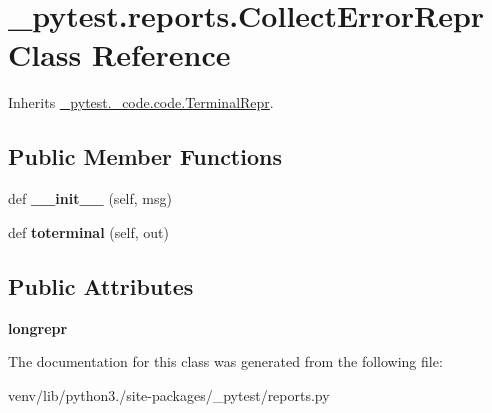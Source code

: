 \hypertarget{class__pytest_1_1reports_1_1_collect_error_repr}{}\section{\+\_\+pytest.\+reports.\+Collect\+Error\+Repr Class Reference}
\label{class__pytest_1_1reports_1_1_collect_error_repr}


Inherits \hyperlink{class__pytest_1_1__code_1_1code_1_1_terminal_repr}{\+\_\+pytest.\+\_\+code.\+code.\+Terminal\+Repr}.

\subsection*{Public Member Functions}
\begin{DoxyCompactItemize}
\item 
\mbox{\label{class__pytest_1_1reports_1_1_collect_error_repr_ab47d3e45b3b4915126bd51fe2d0b2397}} 
def {\bfseries \+\_\+\+\_\+init\+\_\+\+\_\+} (self, msg)
\item 
\mbox{\label{class__pytest_1_1reports_1_1_collect_error_repr_a1ddfe55e5681da4b88bb54402ef5b9b0}} 
def {\bfseries toterminal} (self, out)
\end{DoxyCompactItemize}
\subsection*{Public Attributes}
\begin{DoxyCompactItemize}
\item 
\mbox{\label{class__pytest_1_1reports_1_1_collect_error_repr_a3152ce699aba223dbd727b7fd80a2ef0}} 
{\bfseries longrepr}
\end{DoxyCompactItemize}


The documentation for this class was generated from the following file\+:\begin{DoxyCompactItemize}
\item 
venv/lib/python3./site-\/packages/\+\_\+pytest/reports.\+py\end{DoxyCompactItemize}

